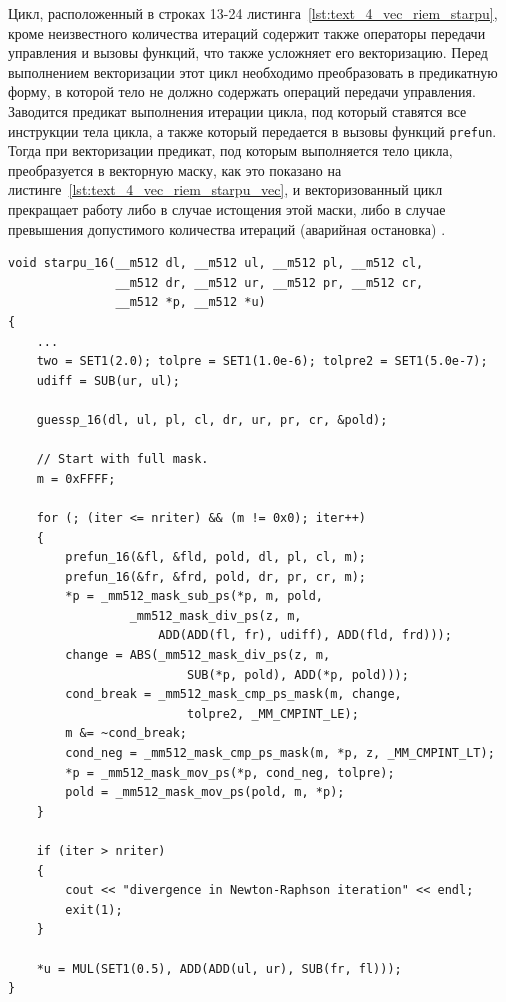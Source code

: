 Цикл, расположенный в строках 13-24 листинга~\ref{lst:text_4_vec_riem_starpu}, кроме неизвестного количества итераций содержит также операторы передачи управления и вызовы функций, что также усложняет его векторизацию.
Перед выполнением векторизации этот цикл необходимо преобразовать в предикатную форму, в которой тело не должно содержать операций передачи управления.
Заводится предикат выполнения итерации цикла, под который ставятся все инструкции тела цикла, а также который передается в вызовы функций \texttt{prefun}.
Тогда при векторизации предикат, под которым выполняется тело цикла, преобразуется в векторную маску, как это показано на листинге~\ref{lst:text_4_vec_riem_starpu_vec}, и векторизованный цикл прекращает работу либо в случае истощения этой маски, либо в случае превышения допустимого количества итераций (аварийная остановка) \cite{Krzikalla2026Vec}.

\begin{lstlisting}[caption={Векторизованная версия функции \texttt{starpu}.},label={lst:text_4_vec_riem_starpu_vec}]
void starpu_16(__m512 dl, __m512 ul, __m512 pl, __m512 cl,
               __m512 dr, __m512 ur, __m512 pr, __m512 cr,
               __m512 *p, __m512 *u)
{
    ...
    two = SET1(2.0); tolpre = SET1(1.0e-6); tolpre2 = SET1(5.0e-7);
    udiff = SUB(ur, ul);

    guessp_16(dl, ul, pl, cl, dr, ur, pr, cr, &pold);

    // Start with full mask.
    m = 0xFFFF;

    for (; (iter <= nriter) && (m != 0x0); iter++)
    {
        prefun_16(&fl, &fld, pold, dl, pl, cl, m);
        prefun_16(&fr, &frd, pold, dr, pr, cr, m);
        *p = _mm512_mask_sub_ps(*p, m, pold,
                 _mm512_mask_div_ps(z, m,
                     ADD(ADD(fl, fr), udiff), ADD(fld, frd)));
        change = ABS(_mm512_mask_div_ps(z, m,
                         SUB(*p, pold), ADD(*p, pold)));
        cond_break = _mm512_mask_cmp_ps_mask(m, change,
                         tolpre2, _MM_CMPINT_LE);
        m &= ~cond_break;
        cond_neg = _mm512_mask_cmp_ps_mask(m, *p, z, _MM_CMPINT_LT);
        *p = _mm512_mask_mov_ps(*p, cond_neg, tolpre);
        pold = _mm512_mask_mov_ps(pold, m, *p);
    }

    if (iter > nriter)
    {
        cout << "divergence in Newton-Raphson iteration" << endl;
        exit(1);
    }

    *u = MUL(SET1(0.5), ADD(ADD(ul, ur), SUB(fr, fl)));
}
\end{lstlisting}


